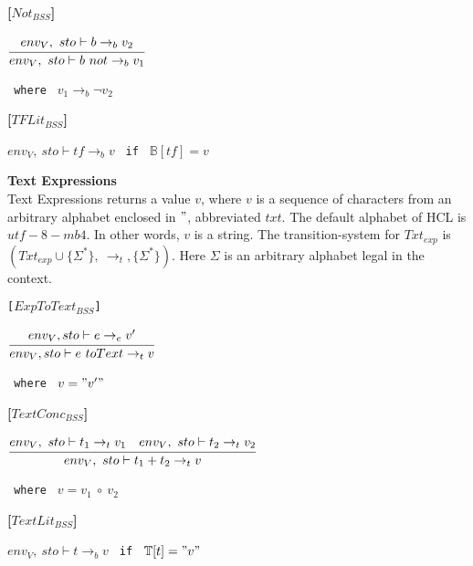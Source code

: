 \textbf{[$Not_{BSS}$]}
\begin{center}
	\begin{math}
	\cfrac
	{env_V,\ sto \vdash b \rightarrow_b v_2}
	{env_V,\ sto \vdash b\ not \rightarrow_b v_1}
	\end{math}
	
	\texttt{ where } $v_1 \rightarrow_b \neg v_2$
\end{center}

\textbf{[$TFLit_{BSS}$]}
\begin{center}
	\begin{math}
	env_V,\ sto \vdash tf \rightarrow_b v
	\end{math}
	\texttt{ if } $\mathbb{B}[tf] = v$
\end{center}

\textbf{\large{Text Expressions}}\\
Text Expressions returns a value $v$, where $v$ is a sequence of characters from an arbitrary alphabet enclosed in $"$, abbreviated $txt$.
The default alphabet of HCL is $utf-8-mb4$.
In other words, $v$ is a string.
The transition-system for $Txt_{exp}$ is $(Txt_{exp} \cup \{\Sigma^*\},\ \rightarrow_t, \{\Sigma^*\})$.
Here $\Sigma$ is an arbitrary alphabet legal in the context.

\texttt{[$ExpToText_{BSS}$]}
\begin{center}
	\begin{math}
	\cfrac
	{env_V, sto \vdash e \rightarrow_{e} v'}
	{env_V, sto \vdash e\ toText \rightarrow_{t} v}
	\end{math}
	
	\texttt{ where } $v = "v'"$
\end{center}

\textbf{[$TextConc_{BSS}$]}
\begin{center}
	\begin{math}
	\cfrac
		{env_V,\ sto \vdash t_1 \rightarrow_t v_1 \quad env_V,\ sto \vdash t_2 \rightarrow_t v_2}
		{env_V,\ sto \vdash t_1 + t_2 \rightarrow_t v}
	\end{math}
	
	\texttt{ where } $v = v_1\ \circ\ v_2$
\end{center}

\textbf{[$TextLit_{BSS}$]}
\begin{center}
	\begin{math}
	env_V,\ sto \vdash t \rightarrow_b v
	\end{math}
	\texttt{ if } $\mathbb{T}[t] = "v"$
\end{center}

